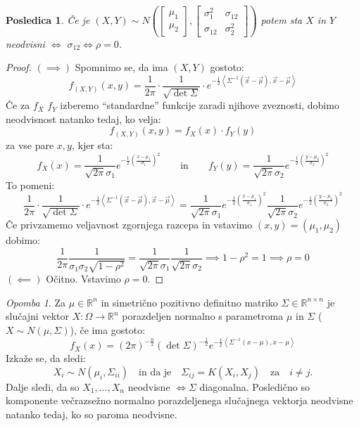 \documentclass[12pt]{book}
\theoremstyle{definition}
\theoremstyle{plain}
\theoremstyle{plain}
\theoremstyle{plain}
\theoremstyle{plain}
\newtheorem{posledica}{Posledica}
\theoremstyle{remark}
\newtheorem*{opomba}{Opomba}
\begin{document}
\begin{posledica}
    Če je $(X,Y) \sim N\left(\begin{bmatrix}\mu_1 \\ \mu_2 \end{bmatrix}, \begin{bmatrix} \sigma_1^2 & \sigma_{12} \\ \sigma_{12} & \sigma_2^2 \end{bmatrix}\right)$ potem sta $X$ in $Y$ neodvisni $\iff$ $\sigma_{12} \iff \rho = 0$.
\end{posledica}

\begin{proof}
    $(\implies)$ Spomnimo se, da ima $(X,Y)$ gostoto:
    $$
    f_{(X,Y)}(x,y) = \frac{1}{2 \pi} \cdot \frac{1}{\sqrt{\det \Sigma}} \cdot e^{-\frac{1}{2}\left\langle\Sigma^{-1}\left(\vec{x} - \vec{\mu}\right), \vec{x} - \vec{\mu}\right\rangle}
    $$
    Če za $f_X$ $f_Y$ izberemo “standardne” funkcije zaradi njihove zveznosti, dobimo neodvisnost natanko tedaj, ko velja:
    $$
    f_{(X, Y)}(x, y)=f_X(x) \cdot f_Y(y)
    $$
    za vse pare $x, y$, kjer sta: 
    $$
    f_X(x)= \frac{1}{\sqrt{2 \pi} \sigma_1} e^{-\frac{1}{2}\left(\frac{x-\mu_1}{\sigma_1}\right)^2} \qquad \text{in} \qquad f_Y(y)=\frac{1}{\sqrt{2 \pi} \sigma_2} e^{-\frac{1}{2}\left(\frac{y-\mu_2}{\sigma_2}\right)^2}
    $$
    To pomeni: 
    $$
    \frac{1}{2 \pi} \cdot \frac{1}{\sqrt{\det \Sigma}} \cdot e^{-\frac{1}{2}\left\langle\Sigma^{-1}\left(\vec{x} - \vec{\mu}\right), \vec{x} - \vec{\mu}\right\rangle} = \frac{1}{\sqrt{2 \pi} \sigma_1} e^{-\frac{1}{2}\left(\frac{x-\mu_1}{\sigma_1}\right)^2} \frac{1}{\sqrt{2 \pi} \sigma_2} e^{-\frac{1}{2}\left(\frac{y-\mu_2}{\sigma_2}\right)^2}
    $$
    Če privzamemo veljavnost zgornjega razcepa in vstavimo $(x, y)=\left(\mu_1, \mu_2\right)$ dobimo:
    $$
    \frac{1}{2 \pi} \frac{1}{\sigma_1 \sigma_2 \sqrt{1 - \rho^2}}= \frac{1}{\sqrt{2 \pi} \sigma_1} \frac{1}{\sqrt{2 \pi} \sigma_2} \implies 1-\rho^2=1 \implies \rho=0
    $$
    $(\impliedby)$ Očitno. Vstavimo $\rho =0$.
\end{proof}

\begin{opomba}
    Za $\mu \in \mathbb{R}^n$ in simetrično pozitivno definitno matriko $\Sigma \in \mathbb{R}^{n \times n}$ je slučajni vektor $X: \Omega \rightarrow \mathbb{R}^n$ porazdeljen normalno s parametroma $\mu$ in $\Sigma$ ($X \sim N(\mu, \Sigma)$), če ima gostoto: 
    $$
    f_X(x)=(2 \pi)^{-\frac{n}{2}}(\det \Sigma)^{-\frac{1}{2}} e^{-\frac{1}{2}\left\langle\Sigma^{-1}(x-\mu), x-\mu\right\rangle}
    $$
    Izkaže se, da sledi:
    $$
    X_i \sim N\left(\mu_i, \Sigma_{i i}\right) \quad \text{in da je} \quad \Sigma_{i j}=K\left(X_i, X_j\right) \quad \text{za} \quad i \neq j.
    $$
    Dalje sledi, da so $X_1, \ldots, X_n$ neodvisne $\iff \Sigma$ diagonalna. Posledično so komponente večrazsežno normalno porazdeljenega slučajnega vektorja neodvisne natanko tedaj, ko so paroma neodvisne.
\end{opomba}
\end{document}

